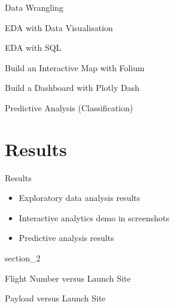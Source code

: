 \begin{frame}{Data Wrangling}

\end{frame}

\begin{frame}{EDA with Data Visualisation}

\end{frame}

\begin{frame}{EDA with SQL}

\end{frame}

\begin{frame}{Build an Interactive Map with Folium}

\end{frame}

\begin{frame}{Build a Dashboard with Plotly Dash}

\end{frame}

\begin{frame}{Predictive Analysis (Classification)}

\end{frame}

\section{Results}

\begin{frame}{Results}
    \begin{itemize}
        \item Exploratory data analysis results
        \item Interactive analytics demo in screenshots
        \item Predictive analysis results
    \end{itemize}
\end{frame}

{
{section_2}
\begin{frame}[plain]
\end{frame}
}

\begin{frame}{Flight Number versus Launch Site}

\end{frame}

\begin{frame}{Payload versus Launch Site}

\end{frame}

